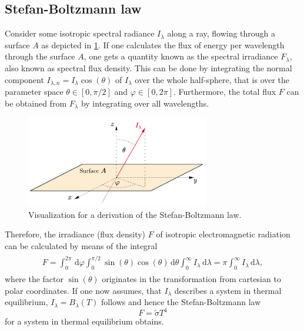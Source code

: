 \documentclass[a4paper,12pt]{report}
\begin{document}
\subsection{Stefan-Boltzmann law}
Consider some isotropic spectral radiance $I_\lambda$ along a ray, flowing through a surface $A$ as depicted in \cref{fig:isotropicrad}. If one calculates the flux of energy per wavelength through the surface $A$, one gets a quantity known as the spectral irradiance $F_\lambda$, also known as spectral flux density. This can be done by integrating the normal component $I_{\lambda,n} = I_\lambda \cos(\theta)$ of $I_\lambda$ over the whole half-sphere, that is over the parameter space $\theta \in [0,\pi/2]$ and $\varphi \in [0,2\pi]$. Furthermore, the total flux $F$ can be obtained from $F_\lambda$ by integrating over all wavelengths.
\begin{figure}[h]
\centering
\includegraphics[width=8cm]{figures/isotropicrad.pdf}
\caption{Visualization for a derivation of the Stefan-Boltzmann law.}
\label{fig:isotropicrad}
\end{figure}
Therefore, the irradiance (flux density) $F$ of isotropic electromagnetic radiation can be calculated by means of the integral \begin{align}
\begin{aligned}
F = \int_{0}^{2\pi}\,\mathrm{d}\varphi \int_{0}^{\pi/2}\sin(\theta)\cos(\theta)\,\mathrm{d}\theta \int_{0}^{\infty}I_\lambda\,\mathrm{d}\lambda = \pi\int_{0}^{\infty}I_\lambda\,\mathrm{d}\lambda,
\end{aligned}
\end{align} where the factor $\sin(\theta)$ originates in the transformation from cartesian to polar coordinates. If one now assumes, that $I_\lambda$ describes a system in thermal equilibrium, $I_\lambda = B_\lambda(T)$ follows and hence the Stefan-Boltzmann law \begin{equation}
F = \tilde{\sigma}T^4
\end{equation} for a system in thermal equilibrium obtains.
\end{document}
